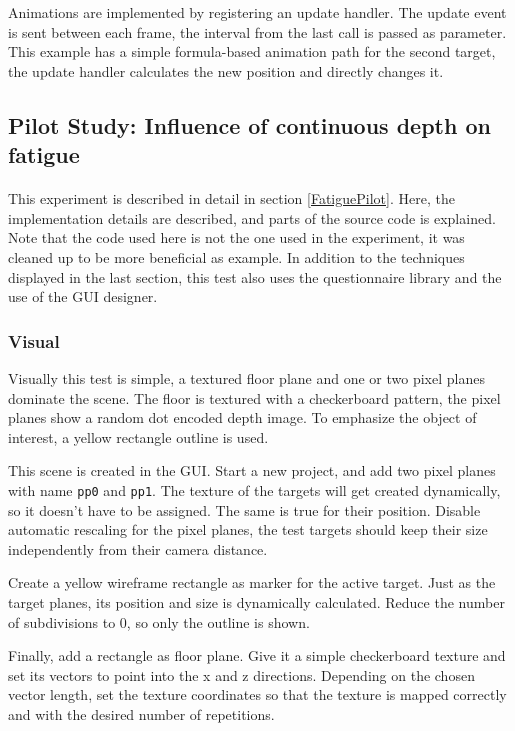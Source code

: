 Animations are implemented by registering an update handler.
The update event is sent between each frame, the interval from the last call is passed as parameter.
This example has a simple formula-based animation path for the second target, the update handler calculates the new position and directly changes it.


\subsection[Influence of continuous depth]{Pilot Study: Influence of continuous depth on fatigue\label{ExampleFatiguePilot}}
\paragraph{}
This experiment is described in detail in section \ref{FatiguePilot}.
Here, the implementation details are described, and parts of the source code is explained.
Note that the code used here is not the one used in the experiment, it was cleaned up to be more beneficial as example.
In addition to the techniques displayed in the last section, this test also uses the questionnaire library and the use of the GUI designer.

\subsubsection{Visual}
Visually this test is simple, a textured floor plane and one or two pixel planes dominate the scene.
The floor is textured with a checkerboard pattern, the pixel planes show a random dot encoded depth image.
To emphasize the object of interest, a yellow rectangle outline is used.

This scene is created in the GUI.
Start a new project, and add two pixel planes with name \texttt{pp0} and \texttt{pp1}.
The texture of the targets will get created dynamically, so it doesn't have to be assigned.
The same is true for their position.
Disable automatic rescaling for the pixel planes, the test targets should keep their size independently from their camera distance.

Create a yellow wireframe rectangle as marker for the active target.
Just as the target planes, its position and size is dynamically calculated.
Reduce the number of subdivisions to 0, so only the outline is shown.

Finally, add a rectangle as floor plane.
Give it a simple checkerboard texture and set its vectors to point into the x and z directions.
Depending on the chosen vector length, set the texture coordinates so that the texture is mapped correctly and with the desired number of repetitions.

